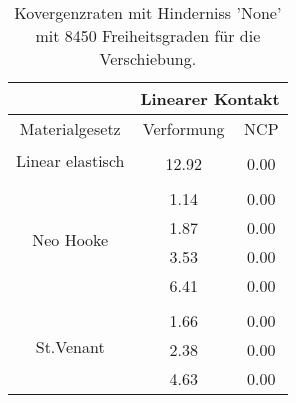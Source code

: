 \begin{table} 
\centering 
\begin{tabular}{c|cc|} 
\cline{2-3} 
 & \multicolumn{2}{|c|}{Linearer Kontakt} \\ 
\hline 
\multicolumn{1}{|c|}{Materialgesetz} & \multicolumn{1}{c|}{Verformung} & \multicolumn{1}{c|}{NCP} \\ 
\hline 
\multicolumn{1}{|c|}{\multirow{2}{*}{Linear elastisch}} &\multicolumn{1}{|c|}{} & \multicolumn{1}{|c|}{} \\ 
\multicolumn{1}{|c|}{} & \multicolumn{1}{|c|}{     12.92} & \multicolumn{1}{|c|}{      0.00} \\ 
\hline 
\multicolumn{1}{|c|}{\multirow{5}{*}{Neo Hooke}} &\multicolumn{1}{|c|}{} & \multicolumn{1}{|c|}{} \\ 
\multicolumn{1}{|c|}{} & \multicolumn{1}{|c|}{      1.14} & \multicolumn{1}{|c|}{      0.00} \\ 
\multicolumn{1}{|c|}{} & \multicolumn{1}{|c|}{      1.87} & \multicolumn{1}{|c|}{      0.00} \\ 
\multicolumn{1}{|c|}{} & \multicolumn{1}{|c|}{      3.53} & \multicolumn{1}{|c|}{      0.00} \\ 
\multicolumn{1}{|c|}{} & \multicolumn{1}{|c|}{      6.41} & \multicolumn{1}{|c|}{      0.00} \\ 
\hline 
\multicolumn{1}{|c|}{\multirow{4}{*}{St.Venant}} &\multicolumn{1}{|c|}{} & \multicolumn{1}{|c|}{} \\ 
\multicolumn{1}{|c|}{} & \multicolumn{1}{|c|}{      1.66} & \multicolumn{1}{|c|}{      0.00} \\ 
\multicolumn{1}{|c|}{} & \multicolumn{1}{|c|}{      2.38} & \multicolumn{1}{|c|}{      0.00} \\ 
\multicolumn{1}{|c|}{} & \multicolumn{1}{|c|}{      4.63} & \multicolumn{1}{|c|}{      0.00} \\ 
\hline 
\end{tabular}\caption{Kovergenzraten mit Hinderniss 'None' mit 8450 Freiheitsgraden für die Verschiebung.}\label{tab:Rate_None_level5}
\end{table} 

